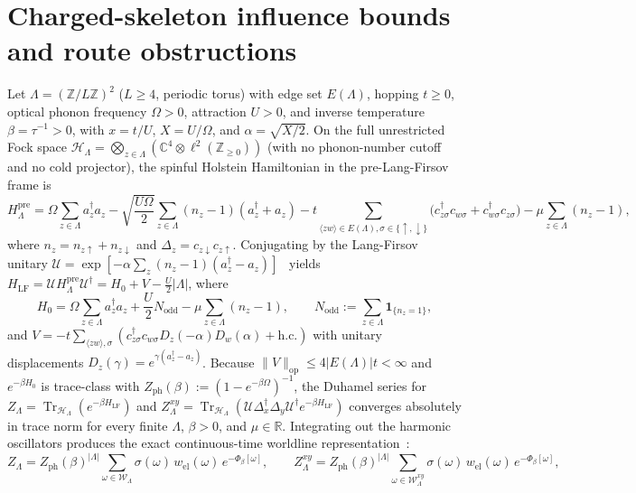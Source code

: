 \documentclass[11pt]{article}
\theoremstyle{definition}
\theoremstyle{remark}
\DeclareMathOperator{\Tr}{Tr}
\newcommand{\R}{\mathbb{R}}
\newcommand{\C}{\mathbb{C}}
\newcommand{\Z}{\mathbb{Z}}
\newcommand{\Nodd}{N_{\mathrm{odd}}}
\newcommand{\Dop}{\Delta}
\newcommand{\LF}{\mathrm{LF}}
\begin{document}
\section{Charged-skeleton influence bounds and route obstructions}
\label{sec:charged-skeleton}

Let $\Lambda = (\Z/L\Z)^2$ ($L \ge 4$, periodic torus) with edge set $E(\Lambda)$,
hopping $t \ge 0$, optical phonon frequency $\Omega > 0$, attraction $U > 0$,
and inverse temperature $\beta = \tau^{-1} > 0$, with $x = t/U$, $X = U/\Omega$,
and $\alpha = \sqrt{X/2}$. On the full unrestricted Fock space
$\mathcal{H}_\Lambda = \bigotimes_{z \in \Lambda} (\C^4 \otimes \ell^2(\Z_{\ge 0}))$
(with no phonon-number cutoff and no cold projector), the spinful Holstein
Hamiltonian in the pre-Lang-Firsov frame is
\begin{equation}
\label{eq:cs-Hpre}
H_\Lambda^{\mathrm{pre}}
= \Omega \sum_{z \in \Lambda} a_z^\dagger a_z
- \sqrt{\frac{U\Omega}{2}} \sum_{z \in \Lambda} (n_z - 1)(a_z^\dagger + a_z)
- t \sum_{\langle zw \rangle \in E(\Lambda), \sigma \in \{\uparrow,\downarrow\}}
  \bigl(c_{z\sigma}^\dagger c_{w\sigma} + c_{w\sigma}^\dagger c_{z\sigma}\bigr)
- \mu \sum_{z \in \Lambda} (n_z - 1),
\end{equation}
where $n_z = n_{z\uparrow} + n_{z\downarrow}$ and $\Dop_z = c_{z\downarrow} c_{z\uparrow}$.
Conjugating by the Lang-Firsov unitary $\mathcal{U} = \exp[-\alpha \sum_z (n_z - 1)(a_z^\dagger - a_z)]$~\cite{langfirsov}
yields $H_{\LF} = \mathcal{U} H_\Lambda^{\mathrm{pre}} \mathcal{U}^\dagger = H_0 + V - \frac{U}{2}|\Lambda|$,
where
\[
H_0 = \Omega \sum_{z \in \Lambda} a_z^\dagger a_z + \frac{U}{2}\Nodd - \mu \sum_{z \in \Lambda}(n_z - 1),
\qquad
\Nodd := \sum_{z \in \Lambda} \mathbf{1}_{\{n_z = 1\}},
\]
and $V = -t \sum_{\langle zw\rangle, \sigma} (c_{z\sigma}^\dagger c_{w\sigma} D_z(-\alpha) D_w(\alpha) + \mathrm{h.c.})$
with unitary displacements $D_z(\gamma) = e^{\gamma(a_z^\dagger - a_z)}$. Because
$\|V\|_{\mathrm{op}} \le 4|E(\Lambda)|t < \infty$ and $e^{-\beta H_0}$ is trace-class
with $Z_{\mathrm{ph}}(\beta) := (1 - e^{-\beta\Omega})^{-1}$, the Duhamel series
for $Z_\Lambda = \Tr_{\mathcal{H}_\Lambda}(e^{-\beta H_{\LF}})$ and
$Z_\Lambda^{xy} = \Tr_{\mathcal{H}_\Lambda}(\mathcal{U}\Dop_x^\dagger \Dop_y \mathcal{U}^\dagger e^{-\beta H_{\LF}})$
converges absolutely in trace norm for every finite $\Lambda$, $\beta > 0$,
and $\mu \in \R$. Integrating out the harmonic oscillators produces the exact
continuous-time worldline representation~\cite{barriers3}:
\[
Z_\Lambda = Z_{\mathrm{ph}}(\beta)^{|\Lambda|}
  \sum_{\omega \in \mathcal{W}_\Lambda} \sigma(\omega)\, w_{\mathrm{el}}(\omega)\, e^{-\Phi_\beta[\omega]},
\qquad
Z_\Lambda^{xy} = Z_{\mathrm{ph}}(\beta)^{|\Lambda|}
  \sum_{\omega \in \mathcal{W}_\Lambda^{xy}} \sigma(\omega)\, w_{\mathrm{el}}(\omega)\, e^{-\Phi_\beta[\omega]},
\]
\end{document}
